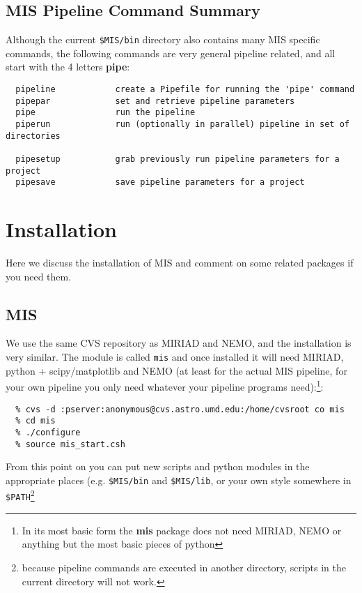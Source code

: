 \documentclass[preprint]{aastex} %
\begin{document}
\section{MIS Pipeline Command Summary} 

Although the current {\tt \$MIS/bin} directory also contains
many MIS specific commands, the following commands are very general
pipeline related, and all start with the 4 letters {\bf pipe}:

\footnotesize
\begin{verbatim}
  pipeline            create a Pipefile for running the 'pipe' command
  pipepar             set and retrieve pipeline parameters
  pipe                run the pipeline
  piperun             run (optionally in parallel) pipeline in set of directories

  pipesetup           grab previously run pipeline parameters for a project
  pipesave            save pipeline parameters for a project
\end{verbatim}
\normalsize   

\chapter{Installation}

Here we discuss the installation of MIS and 
comment on some related packages if you need them.

\section{MIS}

We use the same CVS repository as MIRIAD and NEMO, and the
installation is very similar. The module is called {\tt mis} and
once installed it will need MIRIAD, python + scipy/matplotlib and NEMO
(at least for the actual MIS pipeline, for your own pipeline you only
need whatever your pipeline programs need):\footnote{In its most basic form 
the {\bf mis} package does not need MIRIAD, NEMO or anything but
the most basic pieces of python}:

\footnotesize
\begin{verbatim}
  % cvs -d :pserver:anonymous@cvs.astro.umd.edu:/home/cvsroot co mis
  % cd mis
  % ./configure
  % source mis_start.csh
\end{verbatim}
\normalsize

From this point on you can put new scripts and python modules in
the appropriate places (e.g. {\tt \$MIS/bin} and {\tt \$MIS/lib}, 
or your own style somewhere 
in {\tt \$PATH}\footnote{because pipeline 
commands are executed in another directory,
scripts in the current directory will not work.}
\end{document}
